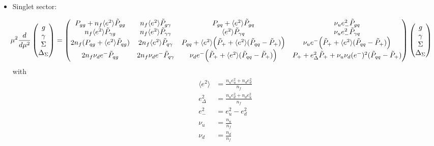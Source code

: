 \documentclass[a4paper,twoside]{article}
\title{}
\author{}
\date{}
\begin{document}
\maketitle
\begin{itemize}
\item Singlet sector:

\begin{equation*}
\hspace*{-0.4cm}\mu^2\frac{d}{d\mu^2}
\begin{pmatrix}
g \\
\gamma \\
\Sigma \\
\Delta_\Sigma
\end{pmatrix}
=
\begin{pmatrix}
 P_{gg}+n_f \langle e^2\rangle \tilde{P}_{gg} & n_f \langle e^2\rangle \tilde{P}_{g\gamma} & P_{gq} + \langle e^2\rangle \tilde{P}_{gq} & \nu_ue^2_-\tilde{P}_{gq} \\
 n_f \langle e^2\rangle \tilde{P}_{\gamma g} & n_f \langle e^2\rangle \tilde{P}_{\gamma \gamma} & \langle e^2\rangle \tilde{P}_{\gamma q} & \nu_ue^2_-\tilde{P}_{\gamma q} \\
 2n_f (P_{qg} +\langle e^2\rangle  \tilde{P}_{qg} )& 2 n_f \langle e^2\rangle  \tilde{P}_{q\gamma} & P_{qq}+ \langle e^2\rangle \Bigl(\tilde{P}_{+} + \langle e^2\rangle(\tilde{P}_{qq}-\tilde{P}_{+})\Bigr) & \nu_ue^-\Bigl(\tilde{P}_{+}+ \langle e^2\rangle (\tilde{P}_{qq}-\tilde{P}_{+}) \Bigr)\\
 2n_f \nu_d e^-\tilde{P}_{qg} & 2n_f \nu_d e^-\tilde{P}_{q\gamma} & \nu_de^-\Bigl( \tilde{P}_{+} +  \langle e^2\rangle (\tilde{P}_{qq}-\tilde{P}_{+}) \Bigr)& P_+ +e_\Delta^2 \tilde{P}_{+} +\nu_u \nu_d (e^-)^2(\tilde{P}_{qq}-\tilde{P}_{+})
\end{pmatrix}
\begin{pmatrix}
g \\
\gamma \\
\Sigma \\
\Delta_\Sigma
\end{pmatrix}
\end{equation*}
with
\begin{align*}
 \langle e^2\rangle&=\frac{n_u e_u^2+n_d e_d^2}{n_f} \\
e_\Delta^2&=\frac{n_u e_d^2+n_d e_u^2}{n_f} \\
e^2_-&= e_u^2 -e_d^2 \\
\nu_u &= \frac{n_u}{n_f}\\
\nu_d &= \frac{n_d}{n_f}
\end{align*}


\end{itemize}
\end{document}
